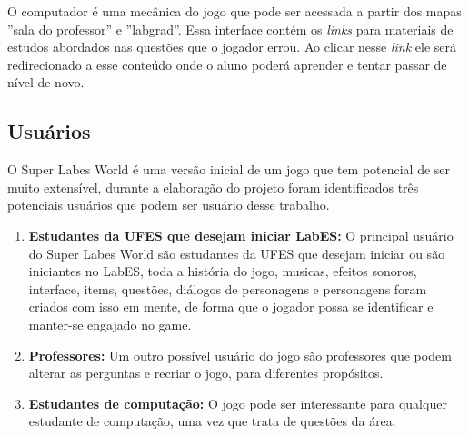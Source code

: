 O computador é uma mecânica do jogo que pode ser acessada a partir dos mapas ''sala do professor'' e ''labgrad''.  Essa interface contém os \textit{links} para materiais de estudos abordados nas questões que o jogador errou. Ao clicar nesse \textit{link} ele será redirecionado a esse conteúdo onde o aluno poderá aprender e tentar passar de nível de novo.
\subsection{Usuários}
\label{sec:usuarios}
O Super Labes World é uma versão inicial de um jogo que tem potencial de ser muito extensível, durante a elaboração do projeto foram identificados três potenciais usuários que podem ser usuário desse trabalho.

\begin{enumerate}
    \item \textbf{Estudantes da UFES que desejam iniciar LabES:} O principal usuário do Super Labes World são estudantes da UFES que desejam iniciar ou são iniciantes no LabES, toda a história do jogo, musicas, efeitos sonoros, interface, items, questões, diálogos de personagens e personagens foram criados com isso em mente, de forma que o jogador possa se identificar e manter-se engajado no game. 
    \item \textbf{Professores:} Um outro possível usuário do jogo são professores que podem alterar as perguntas e recriar o jogo, para diferentes propósitos. 
    \item \textbf{Estudantes de computação:} O jogo pode ser interessante para qualquer estudante de computação, uma vez que trata de questões da área.
\end{enumerate}

